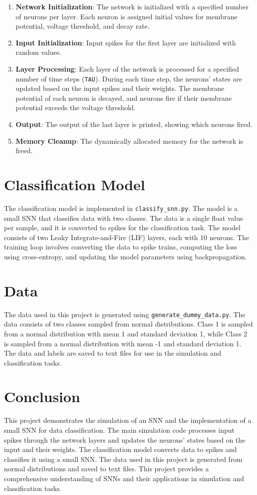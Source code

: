 \documentclass[conference]{IEEEtran}
\begin{document}
\begin{enumerate}
    \item \textbf{Network Initialization}: The network is initialized with a specified number of neurons per layer. Each neuron is assigned initial values for membrane potential, voltage threshold, and decay rate.
    \item \textbf{Input Initialization}: Input spikes for the first layer are initialized with random values.
    \item \textbf{Layer Processing}: Each layer of the network is processed for a specified number of time steps (\texttt{TAU}). During each time step, the neurons' states are updated based on the input spikes and their weights. The membrane potential of each neuron is decayed, and neurons fire if their membrane potential exceeds the voltage threshold.
    \item \textbf{Output}: The output of the last layer is printed, showing which neurons fired.
    \item \textbf{Memory Cleanup}: The dynamically allocated memory for the network is freed.
\end{enumerate}

\section{Classification Model}
The classification model is implemented in \texttt{classify\_snn.py}. The model is a small SNN that classifies data with two classes. The data is a single float value per sample, and it is converted to spikes for the classification task. The model consists of two Leaky Integrate-and-Fire (LIF) layers, each with 10 neurons. The training loop involves converting the data to spike trains, computing the loss using cross-entropy, and updating the model parameters using backpropagation.

\section{Data}
The data used in this project is generated using \texttt{generate\_dummy\_data.py}. The data consists of two classes sampled from normal distributions. Class 1 is sampled from a normal distribution with mean 1 and standard deviation 1, while Class 2 is sampled from a normal distribution with mean -1 and standard deviation 1. The data and labels are saved to text files for use in the simulation and classification tasks.

\section{Conclusion}
This project demonstrates the simulation of an SNN and the implementation of a small SNN for data classification. The main simulation code processes input spikes through the network layers and updates the neurons' states based on the input and their weights. The classification model converts data to spikes and classifies it using a small SNN. The data used in this project is generated from normal distributions and saved to text files. This project provides a comprehensive understanding of SNNs and their applications in simulation and classification tasks.
\end{document}
